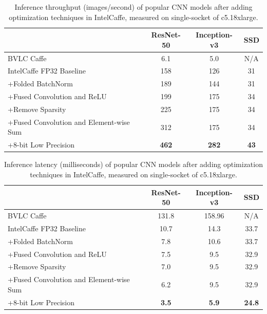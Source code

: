 \begin{table}
\centering
\small
\setlength\tabcolsep{2pt}
  \caption{Inference throughput (images/second) of popular CNN models after adding optimization techniques in IntelCaffe, measured on single-socket of c5.18xlarge.}
\label{tab:baremetal-throughput}
  \begin{tabular}{p{1.6in}ccc}  
    \toprule
    & ResNet-50 & Inception-v3 & SSD\\
    \midrule
BVLC Caffe &  6.1         &     5.0         &    N/A \\

IntelCaffe FP32 Baseline & 158 & 126 & 31 \\

+Folded BatchNorm & 189 & 144 & 31 \\

+Fused Convolution and ReLU & 199 & 175 & 34 \\

+Remove Sparsity & 225 & 175 & 34 \\

+Fused Convolution and Element-wise Sum & 312 & 175 & 34 \\

+8-bit Low Precision & \textbf{462} & \textbf{282} & \textbf{43} \\
  \bottomrule
\end{tabular}
\end{table}

\begin{table}
\centering
\small
\setlength\tabcolsep{2pt}
\caption{Inference latency (milliseconds) of popular CNN models after adding optimization techniques in IntelCaffe, measured on single-socket of c5.18xlarge.}
\label{tab:baremetal-latency}
  \begin{tabular}{p{1.6in}ccc}  
    \toprule
           & ResNet-50 & Inception-v3 & SSD \\
    \midrule
BVLC Caffe &    131.8       &    158.96          &  N/A   \\

IntelCaffe FP32 Baseline & 10.7 & 14.3 & 33.7 \\

+Folded BatchNorm & 7.8 & 10.6 & 33.7 \\

+Fused Convolution and ReLU & 7.5 & 9.5 & 32.9 \\

+Remove Sparsity & 7.0 & 9.5 & 32.9 \\

+Fused Convolution and Element-wise Sum & 6.2 & 9.5 & 32.9 \\

+8-bit Low Precision & \textbf{3.5} & \textbf{5.9} & \textbf{24.8}\\
  \bottomrule
\end{tabular}
\end{table}

